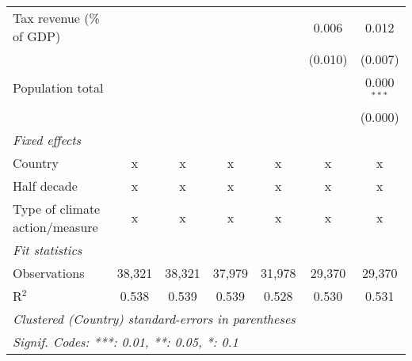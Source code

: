 \begin{tabular}{lcccccc}
   Tax revenue (\% of GDP)                  &             &              &               &               & 0.006         & 0.012\\   
                                            &             &              &               &               & (0.010)       & (0.007)\\   
   Population total                         &             &              &               &               &               & 0.000$^{***}$\\   
                                            &             &              &               &               &               & (0.000)\\   
   \emph{Fixed effects}\\
   Country                                  & x           & x            & x             & x             & x             & x\\  
   Half decade                              & x           & x            & x             & x             & x             & x\\  
   Type of climate action/measure           & x           & x            & x             & x             & x             & x\\  
   \midrule \emph{Fit statistics}\\
   Observations                             & 38,321      & 38,321       & 37,979        & 31,978        & 29,370        & 29,370\\  
   R$^2$                                    & 0.538       & 0.539        & 0.539         & 0.528         & 0.530         & 0.531\\  
   \midrule
   \multicolumn{7}{l}{\emph{Clustered (Country) standard-errors in parentheses}}\\
   \multicolumn{7}{l}{\emph{Signif. Codes: ***: 0.01, **: 0.05, *: 0.1}}\\
\end{tabular}
\par\endgroup


